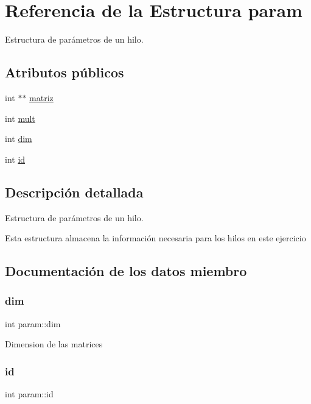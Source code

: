 \hypertarget{structparam}{}\section{Referencia de la Estructura param}
\label{structparam}


Estructura de parámetros de un hilo.  


\subsection*{Atributos públicos}
\begin{DoxyCompactItemize}
\item 
int $\ast$$\ast$ \mbox{\hyperlink{structparam_af5ed705ed1a83675011b4e89d35b91a2}{matriz}}
\item 
int \mbox{\hyperlink{structparam_a6e90bf3ec4545c53ebd617b79b1f5350}{mult}}
\item 
int \mbox{\hyperlink{structparam_a3a102879f95c2d38a100f38dfd6866e4}{dim}}
\item 
int \mbox{\hyperlink{structparam_a413f8071501a89323a249e88c5f7d0a9}{id}}
\end{DoxyCompactItemize}


\subsection{Descripción detallada}
Estructura de parámetros de un hilo. 

Esta estructura almacena la información necesaria para los hilos en este ejercicio 

\subsection{Documentación de los datos miembro}
\mbox{\label{structparam_a3a102879f95c2d38a100f38dfd6866e4}} 
\subsubsection{\texorpdfstring{dim}{dim}}
{\footnotesize\ttfamily int param\+::dim}

Dimension de las matrices \mbox{\label{structparam_a413f8071501a89323a249e88c5f7d0a9}} 
\subsubsection{\texorpdfstring{id}{id}}
{\footnotesize\ttfamily int param\+::id}

